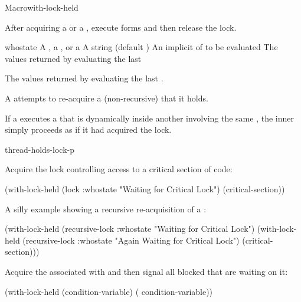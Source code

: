 
\begin{functiondoc}{Macro}{with-lock-held}{\code{(} 
    \code{)}
    \superstar{} 
    \returns{} \superstar}
%
%
%
%

\fnsyntax

\fnpurpose After acquiring a  or a ,
execute forms and then release the lock.

\fnpackage {}

\fnmodule {}

\fnargs
\begin{args}{whostate}
\arg[lock] A , a , or a 
\arg[whostate] A string (default )
\arg[forms] An implicit  of  to be evaluated
\arg[results] The values returned by evaluating the last 
\end{args}

\fnreturns The values returned by evaluating the last .

\fnerrors A  attempts to re-acquire a (non-recursive)
 that it holds.
  
\fndescription If a  executes a 
that is dynamically inside another  involving
the same , the inner 
simply proceeds as if it had acquired the lock.

\begin{alsos}{thread-holds-lock-p}
\end{alsos}

\fnexamples
Acquire the lock controlling access to a critical section of code:
%
\W\supp
\begin{example}
  (with-lock-held (lock :whostate "Waiting for Critical Lock")
    (critical-section))
\end{example}
%
A silly example showing a recursive re-acquisition of a
:
%
\W\supp\notpretop
\begin{example}
  (with-lock-held (recursive-lock :whostate "Waiting for Critical Lock")
    (with-lock-held (recursive-lock :whostate "Again Waiting for Critical Lock")
      (critical-section)))
\end{example}
%
%
%
Acquire the  associated with  and
then signal all blocked  that are waiting on it:
%
\W\supp\notpretop
\begin{example}
  (with-lock-held (condition-variable)
    ( condition-variable))
\end{example}


\end{functiondoc}
